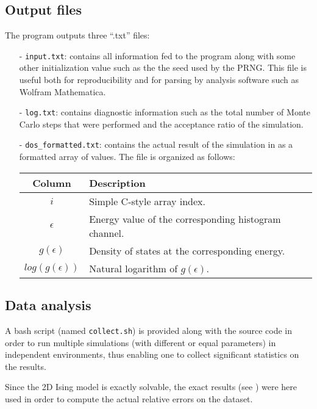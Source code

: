 \documentclass[11pt]{article}
\begin{document}
\subsection{Output files}
The program outputs three ``.txt'' files:
\begin{itemize}
	\item[-] \verb|input.txt|: contains all information fed to the program along with some other initialization value such as the the seed used by the PRNG. This file is useful both for reproducibility and for parsing by analysis software such as Wolfram Mathematica.
	\item[-] \verb|log.txt|: contains diagnostic information such as the total number of Monte Carlo steps that were performed and the acceptance ratio of the simulation.
	\item[-] \verb|dos_formatted.txt|: contains the actual result of the simulation in as a formatted array of values. The file is organized as follows:\\
	\begin{center}\begin{tabular}{cl}
	\toprule
	Column				&	Description												\\
	\midrule
	$i$					&	Simple C-style array index.								\\
	$\epsilon$			&	Energy value of the corresponding histogram channel.	\\
	$g(\epsilon)$		&	Density of states at the corresponding energy.			\\
	$log(g(\epsilon))$	&	Natural logarithm of $g(\epsilon)$.						\\
	\bottomrule
	\end{tabular}\end{center}
\end{itemize}

\subsection{Data analysis}

A bash script (named \verb|collect.sh|) is provided along with the source code in order to run multiple simulations (with different or equal parameters) in independent environments, thus enabling one to collect significant statistics on the results.

Since the 2D Ising model is exactly solvable, the exact results (see \cite{bib:exact}) were here used in order to compute the actual relative errors on the dataset.
\end{document}
